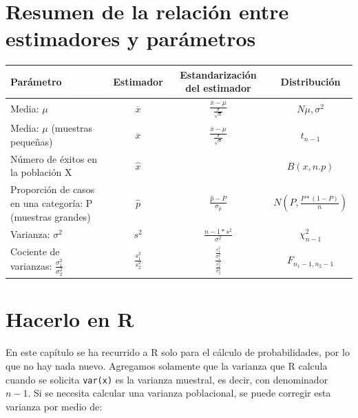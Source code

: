 \documentclass[]{book}
\begin{document}
\hypertarget{resumen-de-la-relaciuxf3n-entre-estimadores-y-paruxe1metros}{%
\section{Resumen de la relación entre estimadores y parámetros}\label{resumen-de-la-relaciuxf3n-entre-estimadores-y-paruxe1metros}}

\begin{table}[H]
\centering
\begin{tabular}{lccc}
\toprule
Parámetro & Estimador & Estandarización del estimador & Distribución\\
\midrule
\rowcolor{gray!6}  Media: $\mu$ & $\overline{x}$ & $\frac{\overline{x} - \mu}{\frac{\sigma}{\sqrt{n}}}$ & $N\mu,\sigma^{2}$\\
Media: $\mu$ (muestras pequeñas) & $\overline{x}$ & $\frac{\overline{x} - \mu}{\frac{\sigma}{\sqrt{n}}}$ & $t_{n - 1}$\\
\rowcolor{gray!6}  Número de éxitos en la población X & $\widehat{x}$ &  & $B(x, n.p)$\\
Proporción de casos en una categoría: P (muestras grandes) & $\widehat{p}$ & $\frac{\widehat{p} - P}{\sigma_{\widehat{p}}}$ & $N(P,\frac{P*(1 - P)}{n})$\\
\rowcolor{gray!6}  Varianza: $\sigma^{2}$ & $s^{2}$ & $\frac{n - 1*s^{2}}{\sigma^{2}}$ & $\chi_{n - 1}^{2}$\\
\addlinespace
Cociente de varianzas: $\frac{\sigma_{1}^{2}}{\sigma_{2}^{2}}$ & $\frac{s_{1}^{2}}{s_{2}^{2}}$ & $\frac{\frac{s_{1}^{2}}{\sigma_{1}^{2}}}{\frac{s_{2}^{2}}{\sigma_{2}^{2}}}$ & $F_{n_{1} - 1,n_{2} - 1}$\\
\bottomrule
\end{tabular}
\end{table}

\hypertarget{hacerlo-en-r-6}{%
\section{Hacerlo en R}\label{hacerlo-en-r-6}}

En este capítulo se ha recurrido a R solo para el cálculo de probabilidades, por lo que no hay nada nuevo.
Agregamos solamente que la varianza que R calcula cuando se solicita \texttt{var(x)} es la varianza muestral, es decir, con denominador \(n-1\). Si se necesita calcular una varianza poblacional, se puede corregir esta varianza por medio de:
\end{document}
